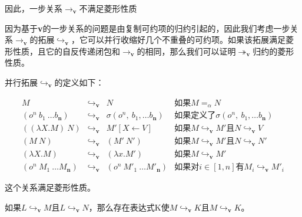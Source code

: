 \documentclass{book}
\begin{document}
因此，一步关系$\rightarrow_{\mathbf{v}}$不满足菱形性质\par
因为基于\textbf{v}的一步关系的问题是由复制可约项的归约引起的，因此我们考虑一步关系$\rightarrow_{\mathbf{v}}$的拓展$\hookrightarrow_{\mathbf{v}}$，它可以并行收缩好几个不重叠的可约项。如果该拓展满足菱形性质，且它的自反传递闭包和$\rightarrow_{\mathbf{v}}$的相同，那么我们可以证明$\twoheadrightarrow_{\mathbf{v}}$归约的菱形性质。\par
并行拓展$\hookrightarrow_{\mathbf{v}}$的定义如下：
\begin{framed}
 $$
 \begin{array}{lcll}
  M & \hookrightarrow_{\mathbf{v}} & N & \text{如果}M=_\alpha N \\
  (o^n\ b_1\ \ldots b_\textbf{n}) & \hookrightarrow_{\mathbf{v}} & \sigma(o^n,\ b_1,\ldots b_\textbf{n}) & \text{如果定义了$\sigma(o^n,\ b_1,\ldots b_\textbf{n})$} \\
  ((\lambda X.M)\ N) & \hookrightarrow_{\mathbf{v}} & M'[X\leftarrow V] & \text{如果$M\hookrightarrow_{\mathbf{v}}M'$且$N\hookrightarrow_{\mathbf{v}}V$}\\
  (M\ N) & \hookrightarrow_{\mathbf{v}} & (M'\ N') & \text{如果$M\hookrightarrow_{\mathbf{v}}M'$且$N\hookrightarrow_{\mathbf{v}}N'$}\\
  (\lambda X.M) & \hookrightarrow_{\mathbf{v}} & (\lambda x.M') & \text{如果$M\hookrightarrow_{\mathbf{v}}M'$}\\
  (o^n\ M_1\ \ldots M_\textbf{n}) & \hookrightarrow_{\mathbf{v}} & (o^n\ M'_1\ \ldots M'_\textbf{n}) & \text{如果对$i\in[1,n]$有$M_i\hookrightarrow_{\mathbf{v}}M'_i$}
 \end{array}
 $$
\end{framed}
这个关系满足菱形性质。
\begin{Theorem}
 如果$L\hookrightarrow_{\mathbf{v}}M$且$L\hookrightarrow_{\mathbf{v}}N$，那么存在表达式K使$M\hookrightarrow_{\mathbf{v}}K$且$M\hookrightarrow_{\mathbf{v}}K$。
\end{Theorem}
\end{document}
